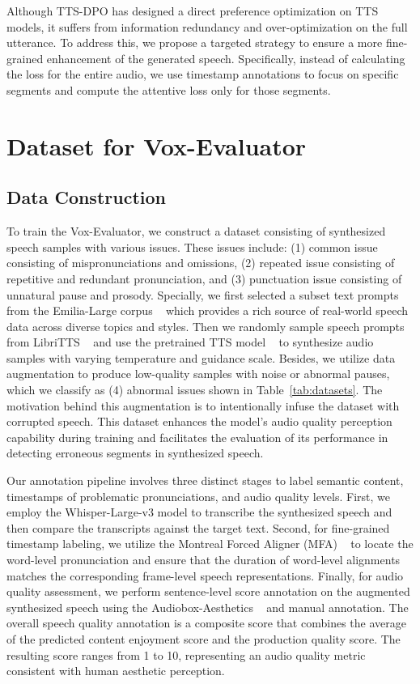 \documentclass[letterpaper]{article} %
\begin{document}
Although TTS-DPO has designed a direct preference optimization on TTS models, it suffers from information redundancy and over-optimization on the full utterance. To address this, we propose a targeted strategy to ensure a more fine-grained enhancement of the generated speech. Specifically, instead of calculating the loss for the entire audio, we use timestamp annotations to focus on specific segments and compute the attentive loss only for those segments.

\section{Dataset for Vox-Evaluator}
\subsection{Data Construction}
To train the Vox-Evaluator, we construct a dataset consisting of synthesized speech samples with various issues. These issues include: (1) common issue consisting of mispronunciations and omissions, (2) repeated issue consisting of repetitive and redundant pronunciation, and (3) punctuation issue consisting of unnatural pause and prosody. Specially, we first selected a subset text prompts from the Emilia-Large corpus ~\cite{he2024emilia} which provides a rich source of real-world speech data across diverse topics and styles. Then we randomly sample speech prompts from LibriTTS ~\cite{zen2019libritts} and use the pretrained TTS model ~\cite{chen2024f5,peng2024voicecraft} to synthesize audio samples with varying temperature and guidance scale. 
Besides, we utilize data augmentation to produce low-quality samples with noise or abnormal pauses, which we classify as (4) abnormal issues shown in Table~\ref{tab:datasets}. The motivation behind this augmentation is to intentionally infuse the dataset with corrupted speech. This dataset enhances the model's audio quality perception capability during training and facilitates the evaluation of its performance in detecting erroneous segments in synthesized speech.

Our annotation pipeline involves three distinct stages to label semantic content, timestamps of problematic pronunciations, and audio quality levels. First, we employ the Whisper-Large-v3 model to transcribe the synthesized speech and then compare the transcripts against the target text. Second, for fine-grained timestamp labeling, we utilize the Montreal Forced Aligner (MFA) ~\cite{kurzinger2020ctc} to locate the word-level pronunciation and ensure that the duration of word-level alignments matches the corresponding frame-level speech representations. Finally, for audio quality assessment, we perform sentence-level score annotation on the augmented synthesized speech using the Audiobox-Aesthetics ~\cite{tjandra2025meta} and manual annotation. The overall speech quality annotation is a composite score that combines the average of the predicted content enjoyment score and the production quality score. The resulting score ranges from 1 to 10, representing an audio quality metric consistent with human aesthetic perception.
\end{document}
